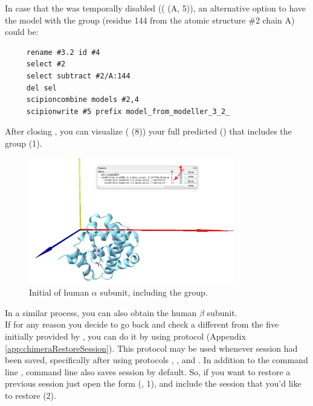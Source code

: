 In case that the   was temporally disabled (( (A, 5)), an alternative option to have the model with the  group (residue 144 from the atomic structure \#2 chain A) could be:
\begin{verbatim}
     rename #3.2 id #4
     select #2
     select subtract #2/A:144
     del sel
     scipioncombine models #2,4
     scipionwrite #5 prefix model_from_modeller_3_2_
 \end{verbatim}

After closing \chimera, you can visualize ( (8)) your full predicted  () that includes the  group (1). 
 
 \begin{figure}[H]
  \centering 
  \captionsetup{width=.7\linewidth} 
  \includegraphics[width=0.80\textwidth]{Images/Fig16}
  \caption{Initial  of human  $\alpha$ subunit, including the  group.}
  \label{fig:chimera_model}
  \end{figure}
  
In a similar process, you can also obtain the human  $\beta$ subunit.\\

If for any reason you decide to go back and check a different  from the five  initially provided by \modeller, you can do it by using  protocol (Appendix \ref{app:chimeraRestoreSession}). This protocol may be used whenever \chimera session had been saved, specifically after using protocols \chimera {}, \chimera {}, and \chimera {}. In addition to the \chimera command line , command line  also saves \chimera session by default. So, if you want to restore a previous session just open the form (, 1), and include the session that you'd like to restore (2).

